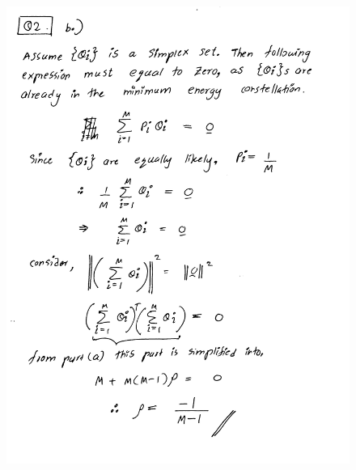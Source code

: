 \documentclass[a4paper,11pt]{article}%
\begin{document}
\begin{figure}[!h]
	\includegraphics[scale=0.22]{figures/img8}
\end{figure}
\end{document}
